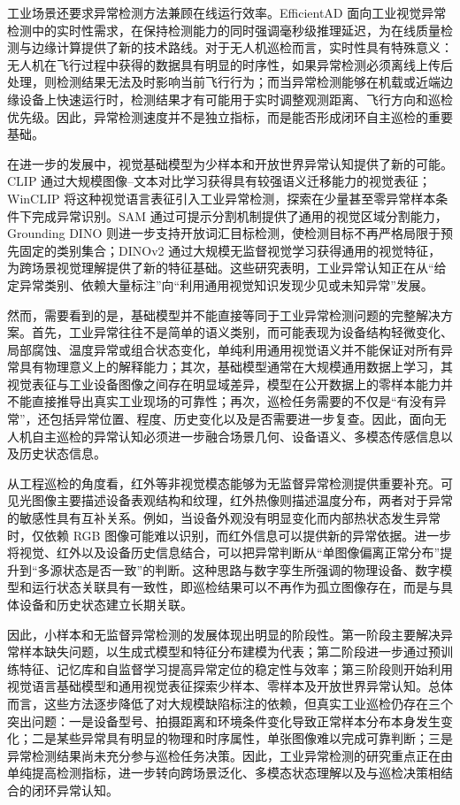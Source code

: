 工业场景还要求异常检测方法兼顾在线运行效率。EfficientAD 面向工业视觉异常检测中的实时性需求，在保持检测能力的同时强调毫秒级推理延迟，为在线质量检测与边缘计算提供了新的技术路线\cite{batzner2024efficientad}。对于无人机巡检而言，实时性具有特殊意义：无人机在飞行过程中获得的数据具有明显的时序性，如果异常检测必须离线上传后处理，则检测结果无法及时影响当前飞行行为；而当异常检测能够在机载或近端边缘设备上快速运行时，检测结果才有可能用于实时调整观测距离、飞行方向和巡检优先级。因此，异常检测速度并不是独立指标，而是能否形成闭环自主巡检的重要基础。

在进一步的发展中，视觉基础模型为少样本和开放世界异常认知提供了新的可能。CLIP 通过大规模图像--文本对比学习获得具有较强语义迁移能力的视觉表征\cite{radford2021learning}；WinCLIP 将这种视觉语言表征引入工业异常检测，探索在少量甚至零异常样本条件下完成异常识别\cite{jeong2023winclip}。SAM 通过可提示分割机制提供了通用的视觉区域分割能力\cite{kirillov2023segment}，Grounding DINO 则进一步支持开放词汇目标检测，使检测目标不再严格局限于预先固定的类别集合\cite{liu2024grounding}；DINOv2 通过大规模无监督视觉学习获得通用的视觉特征，为跨场景视觉理解提供了新的特征基础\cite{oquab2024dinov2}。这些研究表明，工业异常认知正在从“给定异常类别、依赖大量标注”向“利用通用视觉知识发现少见或未知异常”发展。

然而，需要看到的是，基础模型并不能直接等同于工业异常检测问题的完整解决方案。首先，工业异常往往不是简单的语义类别，而可能表现为设备结构轻微变化、局部腐蚀、温度异常或组合状态变化，单纯利用通用视觉语义并不能保证对所有异常具有物理意义上的解释能力；其次，基础模型通常在大规模通用数据上学习，其视觉表征与工业设备图像之间存在明显域差异，模型在公开数据上的零样本能力并不能直接推导出真实工业现场的可靠性；再次，巡检任务需要的不仅是“有没有异常”，还包括异常位置、程度、历史变化以及是否需要进一步复查。因此，面向无人机自主巡检的异常认知必须进一步融合场景几何、设备语义、多模态传感信息以及历史状态信息。

从工程巡检的角度看，红外等非视觉模态能够为无监督异常检测提供重要补充。可见光图像主要描述设备表观结构和纹理，红外热像则描述温度分布，两者对于异常的敏感性具有互补关系\cite{jadin2012recent,usamentiaga2014infrared}。例如，当设备外观没有明显变化而内部热状态发生异常时，仅依赖 RGB 图像可能难以识别，而红外信息可以提供新的异常依据。进一步将视觉、红外以及设备历史信息结合，可以把异常判断从“单图像偏离正常分布”提升到“多源状态是否一致”的判断。这种思路与数字孪生所强调的物理设备、数字模型和运行状态关联具有一致性，即巡检结果可以不再作为孤立图像存在，而是与具体设备和历史状态建立长期关联\cite{tao2019digital}。

因此，小样本和无监督异常检测的发展体现出明显的阶段性。第一阶段主要解决异常样本缺失问题，以生成式模型和特征分布建模为代表；第二阶段进一步通过预训练特征、记忆库和自监督学习提高异常定位的稳定性与效率；第三阶段则开始利用视觉语言基础模型和通用视觉表征探索少样本、零样本及开放世界异常认知\cite{pang2021deep,roth2022towards,batzner2024efficientad,jeong2023winclip}。总体而言，这些方法逐步降低了对大规模缺陷标注的依赖，但真实工业巡检仍存在三个突出问题：一是设备型号、拍摄距离和环境条件变化导致正常样本分布本身发生变化；二是某些异常具有明显的物理和时序属性，单张图像难以完成可靠判断；三是异常检测结果尚未充分参与巡检任务决策。因此，工业异常检测的研究重点正在由单纯提高检测指标，进一步转向跨场景泛化、多模态状态理解以及与巡检决策相结合的闭环异常认知。

